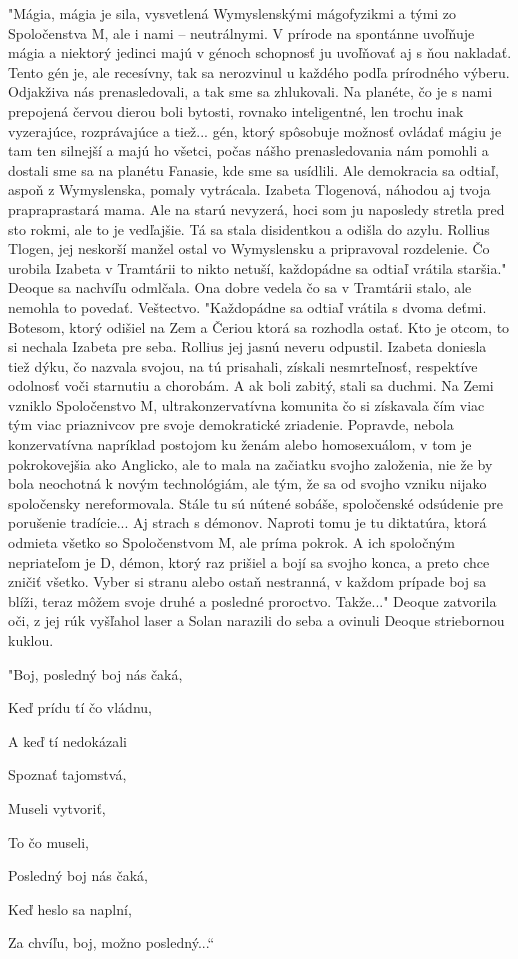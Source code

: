 \documentclass{book}
\begin{document}
"Mágia, mágia je sila, vysvetlená Wymyslenskými mágofyzikmi a tými zo Spoločenstva M, ale i nami – neutrálnymi. V prírode na spontánne uvoľňuje mágia a niektorý jedinci majú v génoch schopnosť ju uvoľňovať aj s ňou nakladať. Tento gén je, ale recesívny, tak sa nerozvinul u každého podľa prírodného výberu. Odjakživa nás prenasledovali, a tak sme sa zhlukovali. Na planéte, čo je s nami prepojená červou dierou boli bytosti, rovnako inteligentné, len trochu inak vyzerajúce, rozprávajúce a tiež... gén, ktorý spôsobuje možnosť ovládať mágiu je tam ten silnejší a majú ho všetci, počas nášho prenasledovania nám pomohli a dostali sme sa na planétu Fanasie, kde sme sa usídlili. Ale demokracia sa odtiaľ, aspoň z Wymyslenska, pomaly vytrácala. Izabeta Tlogenová, náhodou aj tvoja prapraprastará mama. Ale na starú nevyzerá, hoci som ju naposledy stretla pred sto rokmi, ale to je vedľajšie. Tá sa stala disidentkou a odišla do azylu. Rollius Tlogen, jej neskorší manžel ostal vo Wymyslensku a pripravoval rozdelenie. Čo urobila Izabeta v Tramtárii to nikto netuší, každopádne sa odtiaľ vrátila staršia."$ $ Deoque sa nachvíľu odmlčala. Ona dobre vedela čo sa v Tramtárii stalo, ale nemohla to povedať. Veštectvo. "Každopádne sa odtiaľ vrátila s dvoma deťmi. Botesom, ktorý odišiel na Zem a Čeriou ktorá sa rozhodla ostať. Kto je otcom, to si nechala Izabeta pre seba. Rollius jej jasnú neveru odpustil. Izabeta doniesla tiež dýku, čo nazvala svojou, na tú prisahali, získali nesmrteľnosť, respektíve odolnosť voči starnutiu a chorobám. A ak boli zabitý, stali sa duchmi. Na Zemi vzniklo Spoločenstvo M, ultrakonzervatívna komunita čo si získavala čím viac tým viac priaznivcov pre svoje demokratické zriadenie. Popravde, nebola konzervatívna napríklad postojom ku ženám alebo homosexuálom, v tom je pokrokovejšia ako Anglicko, ale to mala na začiatku svojho založenia, nie že by bola neochotná k novým technológiám, ale tým, že sa od svojho vzniku nijako spoločensky nereformovala. Stále tu sú nútené sobáše, spoločenské odsúdenie pre porušenie tradície... Aj strach s démonov. Naproti tomu je tu diktatúra, ktorá odmieta všetko so Spoločenstvom M, ale príma pokrok. A ich spoločným nepriateľom je D, démon, ktorý raz prišiel a bojí sa svojho konca, a preto chce zničiť všetko. Vyber si stranu alebo ostaň nestranná, v každom prípade boj sa blíži, teraz môžem svoje druhé a posledné proroctvo. Takže..."$ $ Deoque zatvorila oči, z jej rúk vyšľahol laser a Solan narazili do seba a ovinuli Deoque striebornou kuklou.

\begin{center}
"Boj, posledný boj nás čaká,

Keď prídu tí čo vládnu,

A keď tí nedokázali

Spoznať tajomstvá,

Museli vytvoriť,

To čo museli,

Posledný boj nás čaká,

Keď heslo sa naplní,

Za chvíľu, boj, možno posledný...“

\end{center}
\end{document}
